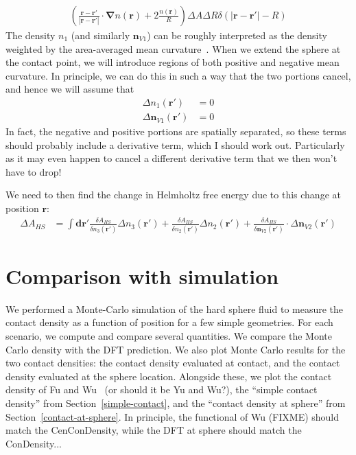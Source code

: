 \documentclass[letterpaper,twocolumn,amsmath,amssymb,prb]{revtex4-1}
\newcommand{\derivation}[1]{} %
\begin{document}
{\begin{align}
    \left(\frac{\mathbf{r}-\mathbf{r}'}{|\mathbf{r}-\mathbf{r}'|}\cdot
    \mathbf{\nabla}n(\mathbf{r}) + 2 \frac{n(\mathbf{r})}{R}
    \right) \Delta A \Delta R
    \delta(|\mathbf{r}-\mathbf{r}'|-R) 
  \end{align}
  The density $n_1$ (and similarly $\mathbf{n}_{V1}$) can be roughly
  interpreted as the density weighted by the area-averaged mean
  curvature~\cite{oversteegen2005general, roth2010review}.  When we
  extend the sphere at the contact point, we will introduce regions of
  both positive and negative mean curvature.  In principle, we can do
  this in such a way that the two portions cancel, and hence we will
  assume that
  \begin{align}
    \Delta n_1(\mathbf{r}') &= 0 \\
    \Delta \mathbf{n}_{V1}(\mathbf{r}') &= 0
  \end{align}
  In fact, the negative and positive portions are spatially separated,
  so these terms should probably include a derivative term, which I
  should work out.  Particularly as it may even happen to cancel a
  different derivative term that we then won't have to drop!
  
  We need to then find the change in Helmholtz free energy due to this
  change at position $\mathbf{r}$:
  \begin{align}
    \Delta A_{HS} &= \int \mathbf{dr}'
    \frac{\delta A_{HS}}{\delta n_3(\mathbf{r}')}\Delta n_3(\mathbf{r}')
    +
    \frac{\delta A_{HS}}{\delta n_2(\mathbf{r}')}\Delta n_2(\mathbf{r}')
    +
    \frac{\delta A_{HS}}{\delta \mathbf{n}_{V2}(\mathbf{r}')} \cdot \Delta \mathbf{n}_{V2}(\mathbf{r}')
  \end{align}
}

\derivation{
  \end{widetext}
}

\section{Comparison with simulation}

We performed a Monte-Carlo simulation of the hard sphere fluid to
measure the contact density as a function of position for a few simple
geometries.  For each scenario, we compute and compare several
quantities.  We compare the Monte Carlo density with the DFT
prediction.  We also plot Monte Carlo results for the two contact
densities: the contact density evaluated at contact, and the contact
density evaluated at the sphere location.  Alongside these, we plot
the contact density of Fu and Wu~\cite{fu2005vapor-liquid-dft} (or
should it be Yu and Wu\cite{yu2002structures,
  yu2002fmt-dft-inhomogeneous-associating}?), the ``simple contact
density'' from Section~\ref{simple-contact}, and the ``contact density
at sphere'' from Section~\ref{contact-at-sphere}.  In principle, the
functional of Wu (FIXME) should match the CenConDensity, while the DFT
at sphere should match the ConDensity...
\end{document}
